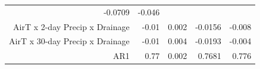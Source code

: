 \begin{longtable}[]{@{}rrrrr@{}}
\begin{minipage}[t]{0.10\columnwidth}
-0.0709\strut
\end{minipage} & \begin{minipage}[t]{0.10\columnwidth}\raggedleft\strut
-0.046\strut
\end{minipage}\tabularnewline
\begin{minipage}[t]{0.37\columnwidth}\raggedleft\strut
AirT x 2-day Precip x Drainage\strut
\end{minipage} & \begin{minipage}[t]{0.08\columnwidth}\raggedleft\strut
-0.01\strut
\end{minipage} & \begin{minipage}[t]{0.07\columnwidth}\raggedleft\strut
0.002\strut
\end{minipage} & \begin{minipage}[t]{0.10\columnwidth}\raggedleft\strut
-0.0156\strut
\end{minipage} & \begin{minipage}[t]{0.10\columnwidth}\raggedleft\strut
-0.008\strut
\end{minipage}\tabularnewline
\begin{minipage}[t]{0.37\columnwidth}\raggedleft\strut
AirT x 30-day Precip x Drainage\strut
\end{minipage} & \begin{minipage}[t]{0.08\columnwidth}\raggedleft\strut
-0.01\strut
\end{minipage} & \begin{minipage}[t]{0.07\columnwidth}\raggedleft\strut
0.004\strut
\end{minipage} & \begin{minipage}[t]{0.10\columnwidth}\raggedleft\strut
-0.0193\strut
\end{minipage} & \begin{minipage}[t]{0.10\columnwidth}\raggedleft\strut
-0.004\strut
\end{minipage}\tabularnewline
\begin{minipage}[t]{0.37\columnwidth}\raggedleft\strut
AR1\strut
\end{minipage} & \begin{minipage}[t]{0.08\columnwidth}\raggedleft\strut
0.77\strut
\end{minipage} & \begin{minipage}[t]{0.07\columnwidth}\raggedleft\strut
0.002\strut
\end{minipage} & \begin{minipage}[t]{0.10\columnwidth}\raggedleft\strut
0.7681\strut
\end{minipage} & \begin{minipage}[t]{0.10\columnwidth}\raggedleft\strut
0.776\strut
\end{minipage}\tabularnewline
\bottomrule
\end{longtable}

